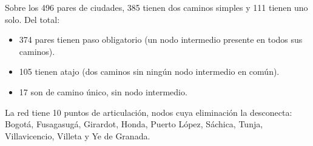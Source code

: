 Sobre los 496 pares de ciudades, 385 tienen dos caminos simples y 111 tienen uno solo. Del total:
\begin{itemize}
\item 374 pares tienen paso obligatorio (un nodo intermedio presente en todos sus caminos).
\item 105 tienen atajo (dos caminos sin ningún nodo intermedio en común).
\item 17 son de camino único, sin nodo intermedio.
\end{itemize}
La red tiene 10 puntos de articulación, nodos cuya eliminación la desconecta: Bogotá, Fusagasugá, Girardot, Honda, Puerto López, Sáchica, Tunja, Villavicencio, Villeta y Ye de Granada.
